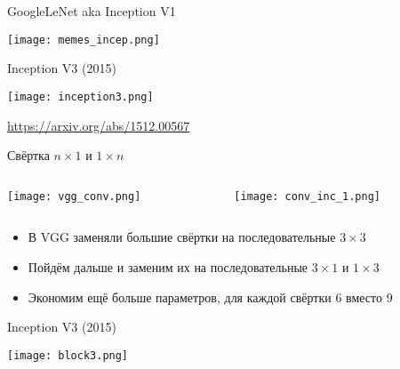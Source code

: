 \documentclass[notes,12pt, aspectratio=169]{beamer}
\begin{document}
\begin{frame}{GoogleLeNet aka Inception V1}
\begin{center}
	\texttt{[image: memes\_incep.png]}
\end{center}
\end{frame}


\begin{frame}{Inception V3 (2015)}
\begin{center}
	\texttt{[image: inception3.png]}
\end{center}
\vfill %
\footnotesize
\color{blue} \url{https://arxiv.org/abs/1512.00567}
\end{frame}


\begin{frame}{Свёртка $n \times 1$ и $1 \times n$ }
\begin{columns}[T] %
	\begin{column}{.6\textwidth}
	\centering	\texttt{[image: vgg\_conv.png]}
	\end{column}%
	\hfill%
	\begin{column}{.4\textwidth}
	\centering 	\texttt{[image: conv\_inc\_1.png]} 
	\end{column}%
\end{columns}
\vfill
\begin{itemize}
	\item В VGG заменяли большие свёртки на последовательные $3 \times 3$
	\item Пойдём дальше и заменим их на последовательные $3 \times 1$ и $1 \times 3$
	\item Экономим ещё больше параметров, для каждой свёртки $6$ вместо $9$ 
\end{itemize}
\end{frame}


\begin{frame}{Inception V3 (2015)}
\begin{center}
	\texttt{[image: block3.png]}
\end{center}
\end{frame}
\end{document}
